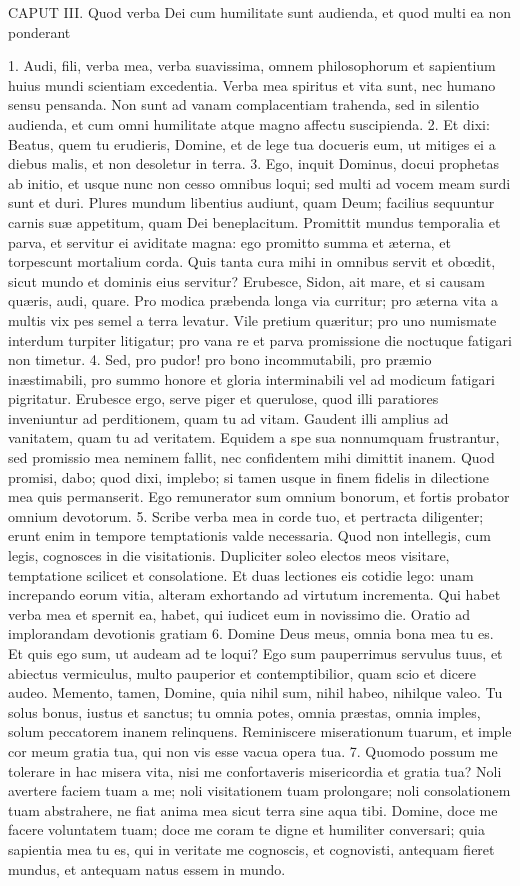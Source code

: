 \documentclass[twoside]{article}
\begin{document}
CAPUT III.
Quod verba Dei cum humilitate sunt audienda, et quod multi ea non ponderant

1. Audi, fili, verba mea, verba suavissima, omnem philosophorum et sapientium huius mundi scientiam excedentia. Verba mea spiritus et vita sunt, nec humano sensu pensanda. Non sunt ad vanam complacentiam trahenda, sed in silentio audienda, et cum omni humilitate atque magno affectu suscipienda.
2. Et dixi: Beatus, quem tu erudieris, Domine, et de lege tua docueris eum, ut mitiges ei a diebus malis, et non desoletur in terra.
3. Ego, inquit Dominus, docui prophetas ab initio, et usque nunc non cesso omnibus loqui; sed multi ad vocem meam surdi sunt et duri. Plures mundum libentius audiunt, quam Deum; facilius sequuntur carnis suæ appetitum, quam Dei beneplacitum. Promittit mundus temporalia et parva, et servitur ei aviditate magna: ego promitto summa et æterna, et torpescunt mortalium corda. Quis tanta cura mihi in omnibus servit et obœdit, sicut mundo et dominis eius servitur? Erubesce, Sidon, ait mare, et si causam quæris, audi, quare. Pro modica præbenda longa via curritur; pro æterna vita a multis vix pes semel a terra levatur. Vile pretium quæritur; pro uno numismate interdum turpiter litigatur; pro vana re et parva promissione die noctuque fatigari non timetur.
4. Sed, pro pudor! pro bono incommutabili, pro præmio inæstimabili, pro summo honore et gloria interminabili vel ad modicum fatigari pigritatur. Erubesce ergo, serve piger et querulose, quod illi paratiores inveniuntur ad perditionem, quam tu ad vitam. Gaudent illi amplius ad vanitatem, quam tu ad veritatem. Equidem a spe sua nonnumquam frustrantur, sed promissio mea neminem fallit, nec confidentem mihi dimittit inanem. Quod promisi, dabo; quod dixi, implebo; si tamen usque in finem fidelis in dilectione mea quis permanserit. Ego remunerator sum omnium bonorum, et fortis probator omnium devotorum.
5. Scribe verba mea in corde tuo, et pertracta diligenter; erunt enim in tempore temptationis valde necessaria. Quod non intellegis, cum legis, cognosces in die visitationis. Dupliciter soleo electos meos visitare, temptatione scilicet et consolatione. Et duas lectiones eis cotidie lego: unam increpando eorum vitia, alteram exhortando ad virtutum incrementa. Qui habet verba mea et spernit ea, habet, qui iudicet eum in novissimo die.
Oratio ad implorandam devotionis gratiam
6. Domine Deus meus, omnia bona mea tu es. Et quis ego sum, ut audeam ad te loqui? Ego sum pauperrimus servulus tuus, et abiectus vermiculus, multo pauperior et contemptibilior, quam scio et dicere audeo. Memento, tamen, Domine, quia nihil sum, nihil habeo, nihilque valeo. Tu solus bonus, iustus et sanctus; tu omnia potes, omnia præstas, omnia imples, solum peccatorem inanem relinquens. Reminiscere miserationum tuarum, et imple cor meum gratia tua, qui non vis esse vacua opera tua.
7. Quomodo possum me tolerare in hac misera vita, nisi me confortaveris misericordia et gratia tua? Noli avertere faciem tuam a me; noli visitationem tuam prolongare; noli consolationem tuam abstrahere, ne fiat anima mea sicut terra sine aqua tibi. Domine, doce me facere voluntatem tuam; doce me coram te digne et humiliter conversari; quia sapientia mea tu es, qui in veritate me cognoscis, et cognovisti, antequam fieret mundus, et antequam natus essem in mundo.
\end{document}
